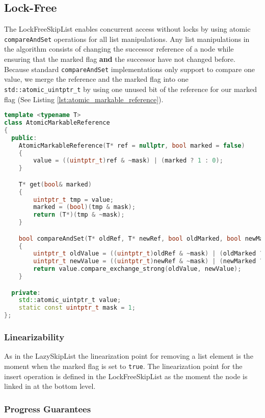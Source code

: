 \subsection{Lock-Free}
The LockFreeSkipList enables concurrent access without locks by using atomic \texttt{compareAndSet} operations for all list manipulations. Any list manipulations in the algorithm consists of changing the successor reference of a node while ensuring that the marked flag \textbf{and} the successor have not changed before. Because standard \texttt{compareAndSet} implementations only support to compare one value, we merge the reference and the marked flag into one \texttt{std::atomic\_uintptr\_t} by using one unused bit of the reference for our marked flag (See Listing \ref{lst:atomic_markable_reference}).

\begin{lstlisting}[language=C++, caption={AtomicMarkableReference}, label=lst:atomic_markable_reference]
template <typename T>
class AtomicMarkableReference
{
  public:
    AtomicMarkableReference(T* ref = nullptr, bool marked = false)
    {
        value = ((uintptr_t)ref & ~mask) | (marked ? 1 : 0);
    }

    T* get(bool& marked)
    {
        uintptr_t tmp = value;
        marked = (bool)(tmp & mask);
        return (T*)(tmp & ~mask);
    }

    bool compareAndSet(T* oldRef, T* newRef, bool oldMarked, bool newMarked)
    {
        uintptr_t oldValue = ((uintptr_t)oldRef & ~mask) | (oldMarked ? 1 : 0);
        uintptr_t newValue = ((uintptr_t)newRef & ~mask) | (newMarked ? 1 : 0);
        return value.compare_exchange_strong(oldValue, newValue);
    }

  private:
    std::atomic_uintptr_t value;
    static const uintptr_t mask = 1;
};
\end{lstlisting}

\subsubsection*{Linearizability}
\noindent As in the LazySkipList the linearization point for removing a list element is the moment when the marked flag is set to \texttt{true}. The linearization point for the insert operation is defined in the LockFreeSkipList as the moment the node is linked in at the bottom level.

\subsubsection*{Progress Guarantees}



